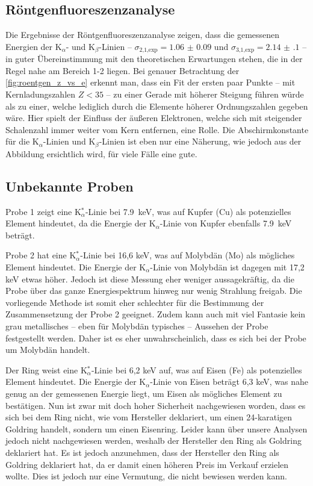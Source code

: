 \documentclass[ngerman]{scrartcl}
\begin{document}
\subsection{Röntgenfluoreszenzanalyse}
\label{sec:diskussion_roentgen}

Die Ergebnisse der Röntgenfluoreszenzanalyse zeigen, dass die gemessenen Energien der K$_{\alpha}$- und K$_{\beta}$-Linien -- $\sigma_{\text{2,1,exp}} = \num{1.06(9)}$ und $\sigma_{\text{3,1,exp}} = \num{2.14(10)}$ -- in guter Übereinstimmung mit den theoretischen Erwartungen stehen, die in der Regel nahe am Bereich 1-2 liegen. Bei genauer Betrachtung der \autoref{fig:roentgen_z_vs_e} erkennt man, dass ein Fit der ersten paar Punkte -- mit Kernladungszahlen $Z<35$ -- zu einer Gerade mit höherer Steigung führen würde als zu einer, welche lediglich durch die Elemente höherer Ordnungszahlen gegeben wäre. Hier spielt der Einfluss der äußeren Elektronen, welche sich mit steigender Schalenzahl immer weiter vom Kern entfernen, eine Rolle. Die Abschirmkonstante für die K$_{\alpha}$-Linien und K$_{\beta}$-Linien ist eben nur eine Näherung, wie jedoch aus der Abbildung ersichtlich wird, für viele Fälle eine gute.

\subsection{Unbekannte Proben}
\label{sec:diskussion_unbekannt}

Probe 1 zeigt eine K$_{\alpha}^*$-Linie bei \SI{7.9}{\kilo\electronvolt}, was auf Kupfer (Cu) als potenzielles Element hindeutet, da die Energie der K${_\alpha}$-Linie von Kupfer ebenfalls \SI{7.9}{\kilo\electronvolt} beträgt.

Probe 2 hat eine K$_{\alpha}^*$-Linie bei 16,6 keV, was auf Molybdän (Mo) als mögliches Element hindeutet. Die Energie der K$_{\alpha}$-Linie von Molybdän ist dagegen mit 17,2 keV etwas höher. Jedoch ist diese Messung eher weniger aussagekräftig, da die Probe über das ganze Energiespektrum hinweg nur wenig Strahlung freigab. Die vorliegende Methode ist somit eher schlechter für die Bestimmung der Zusammensetzung der Probe 2 geeignet. Zudem kann auch mit viel Fantasie kein grau metallisches -- eben für Molybdän typisches -- Aussehen der Probe festgestellt werden. Daher ist es eher unwahrscheinlich, dass es sich bei der Probe um Molybdän handelt.

Der Ring weist eine K$_{\alpha}^*$-Linie bei 6,2 keV auf, was auf Eisen (Fe) als potenzielles Element hindeutet. Die Energie der K$_{\alpha}$-Linie von Eisen beträgt 6,3 keV, was nahe genug an der gemessenen Energie liegt, um Eisen als mögliches Element zu bestätigen. Nun ist zwar mit doch hoher Sicherheit nachgewiesen worden, dass es sich bei dem Ring nicht, wie vom Hersteller deklariert, um einen 24-karatigen Goldring handelt, sondern um einen Eisenring. Leider kann über unsere Analysen jedoch nicht nachgewiesen werden, weshalb der Hersteller den Ring als Goldring deklariert hat. Es ist jedoch anzunehmen, dass der Hersteller den Ring als Goldring deklariert hat, da er damit einen höheren Preis im Verkauf erzielen wollte. Dies ist jedoch nur eine Vermutung, die nicht bewiesen werden kann.
\end{document}
